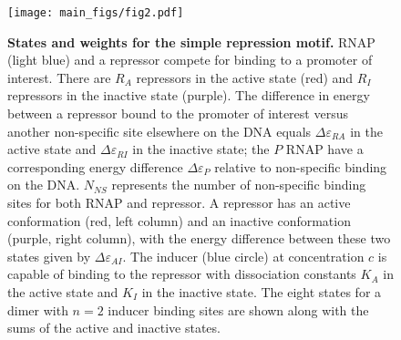 \begin{figure}
	\centering \texttt{[image: main\_figs/fig2.pdf]}

	\caption{\textbf{States and weights for the simple repression motif.}
	 RNAP (light blue) and a repressor compete for binding to a
	promoter of interest. There are $R_A$ repressors in the active state (red) and
	$R_I$ repressors in the inactive state (purple). The difference in energy
	between a repressor bound to the promoter of interest versus another
	non-specific site elsewhere on the DNA equals $\Delta\varepsilon_{RA}$ in the
	active state and $\Delta\varepsilon_{RI}$ in the inactive state; the $P$ RNAP
	have a corresponding energy difference $\Delta\varepsilon_{P}$ relative to
	non-specific binding on the DNA. $N_{NS}$ represents the number of non-specific
	binding sites for both RNAP and repressor.  A repressor has an
	active conformation (red, left column) and an inactive conformation (purple, right
	column), with the energy difference between these two states given by $\Delta
	\varepsilon_{AI}$. The inducer (blue circle) at concentration $c$ is capable of
	binding to the repressor with dissociation constants $K_A$ in the active state
	and $K_I$ in the inactive state. The eight states for a dimer with $n=2$
	inducer binding sites are shown along with the sums of the active and inactive states.} \label{fig_polymerase_repressor_states}
\end{figure}

